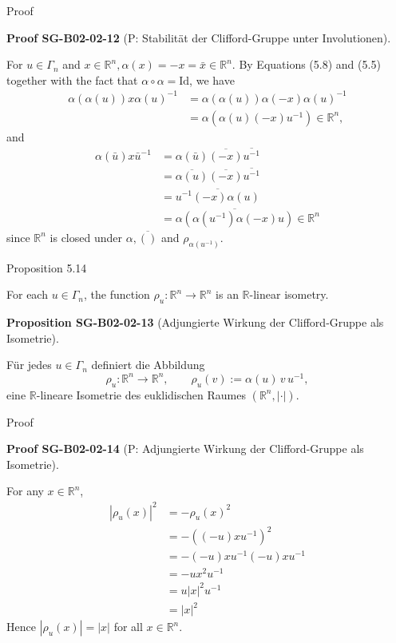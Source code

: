 \documentclass[10pt, letterpaper]{article}
\newcommand{\R}{\mathbb{R}}
\newcommand{\CustomHeading}[3]{%
  \par\medskip\noindent%
  \textbf{#1 #2} \textnormal{(#3)}.\enskip%
}
\newenvironment{PROP}[2]{\begin{unitbox}\CustomHeading{Proposition}{#1}{#2}}{\end{unitbox}}
\newenvironment{PROOF}[2]{\begin{unitbox}\CustomHeading{Proof}{#1}{#2}}{\end{unitbox}}
\begin{document}
Proof

\begin{PROOF}{SG-B02-02-12}{P: Stabilität der Clifford-Gruppe unter Involutionen}
For $u \in \Gamma_{n}$ and $x \in \mathbb{R}^{n}, \alpha(x)=-x=\bar{x} \in \mathbb{R}^{n}$. By Equations (5.8) and (5.5) together with the fact that $\alpha \circ \alpha=\mathrm{Id}$, we have
$$
\begin{aligned}
\alpha(\alpha(u)) x \alpha(u)^{-1} & =\alpha(\alpha(u)) \alpha(-x) \alpha(u)^{-1} \\
& =\alpha\left(\alpha(u)(-x) u^{-1}\right) \in \mathbb{R}^{n},
\end{aligned}
$$
and
$$
\begin{aligned}
\alpha(\bar{u}) x \bar{u}^{-1} & =\alpha(\bar{u}) \overline{(-x)} \overline{u^{-1}} \\
& =\overline{\alpha(u)} \overline{(-x)} \overline{u^{-1}} \\
& =\overline{u^{-1}(-x) \alpha(u)} \\
& =\overline{\alpha\left(\alpha\left(u^{-1}\right) \alpha(-x) u\right)} \in \mathbb{R}^{n}
\end{aligned}
$$
since $\mathbb{R}^{n}$ is closed under $\alpha, \overline{()}$ and $\rho_{\alpha\left(u^{-1}\right)}$.
\end{PROOF}



Proposition 5.14


For each $u \in \Gamma_{n}$, the function $\rho_{u}: \mathbb{R}^{n} \longrightarrow \mathbb{R}^{n}$ is an $\mathbb{R}$-linear isometry.

\begin{PROP}{SG-B02-02-13}{Adjungierte Wirkung der Clifford-Gruppe als Isometrie}
Für jedes \(u \in \Gamma_n\) definiert die Abbildung
\[
\rho_u : \R^n \longrightarrow \R^n,
\qquad
\rho_u(v) := \alpha(u)\, v\, u^{-1},
\]
eine \(\R\)-lineare Isometrie des euklidischen Raumes \((\R^n,|\cdot|)\).
\end{PROP}

Proof

\begin{PROOF}{SG-B02-02-14}{P: Adjungierte Wirkung der Clifford-Gruppe als Isometrie}
For any $x \in \mathbb{R}^{n}$,
$$
\begin{aligned}
\left|\rho_{u}(x)\right|^{2} & =-\rho_{u}(x)^{2} \\
& =-\left((-u) x u^{-1}\right)^{2} \\
& =-(-u) x u^{-1}(-u) x u^{-1} \\
& =-u x^{2} u^{-1} \\
& =u|x|^{2} u^{-1} \\
& =|x|^{2}
\end{aligned}
$$
Hence $\left|\rho_{u}(x)\right|=|x|$ for all $x \in \mathbb{R}^{n}$.
\end{PROOF}
\end{document}
